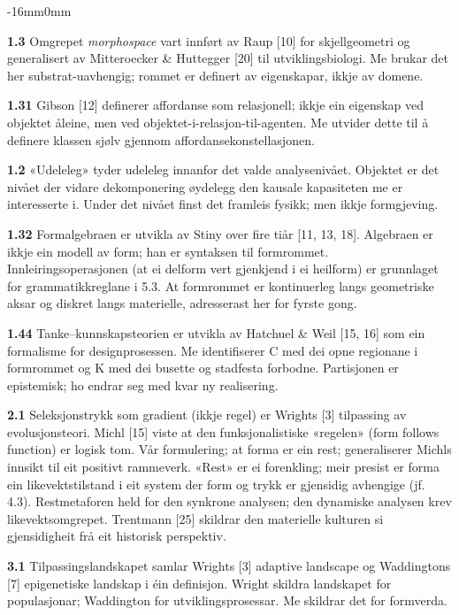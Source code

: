 \documentclass[10pt,oneside]{book}
\newcommand{\silentchapter}[2]{%
  \clearpage
  \markboth{#2}{}%
  \addcontentsline{toc}{chapter}{#1}%
}
\newenvironment{widebody}{%
  \begin{adjustwidth}{-16mm}{0mm}%
}{%
  \end{adjustwidth}%
}
\begin{document}
\silentchapter{Notat}{notat}
\begin{widebody}
{\footnotesize

\textbf{1.3} Omgrepet \textit{morphospace} vart innført av Raup [10] for skjellgeometri og generalisert av Mitteroecker \& Huttegger [20] til utviklingsbiologi. Me brukar det her substrat-uavhengig; rommet er definert av eigenskapar, ikkje av domene.

\textbf{1.31} Gibson [12] definerer affordanse som relasjonell; ikkje ein eigenskap ved objektet åleine, men ved objektet-i-relasjon-til-agenten. Me utvider dette til å definere klassen sjølv gjennom affordansekonstellasjonen.

\textbf{1.2} «Udeleleg» tyder udeleleg innanfor det valde analysenivået. Objektet er det nivået der vidare dekomponering øydelegg den kausale kapasiteten me er interesserte i. Under det nivået finst det framleis fysikk; men ikkje formgjeving.

\textbf{1.32} Formalgebraen er utvikla av Stiny over fire tiår [11, 13, 18]. Algebraen er ikkje ein modell av form; han er syntaksen til formrommet. Innleiringsoperasjonen (at ei delform vert gjenkjend i ei heilform) er grunnlaget for grammatikkreglane i 5.3. At formrommet er kontinuerleg langs geometriske aksar og diskret langs materielle, adresserast her for fyrste gong.

\textbf{1.44} Tanke--kunnskapsteorien er utvikla av Hatchuel \& Weil [15, 16] som ein formalisme for designprosessen. Me identifiserer C med dei opne regionane i formrommet og K med dei busette og stadfesta forbodne. Partisjonen er epistemisk; ho endrar seg med kvar ny realisering.

\textbf{2.1} Seleksjonstrykk som gradient (ikkje regel) er Wrights [3] tilpassing av evolusjonsteori. Michl [15] viste at den funksjonalistiske «regelen» (form follows function) er logisk tom. Vår formulering; at forma er ein rest; generaliserer Michls innsikt til eit positivt rammeverk. «Rest» er ei forenkling; meir presist er forma ein likevektstilstand i eit system der form og trykk er gjensidig avhengige (jf. 4.3). Restmetaforen held for den synkrone analysen; den dynamiske analysen krev likevektsomgrepet. Trentmann [25] skildrar den materielle kulturen si gjensidigheit frå eit historisk perspektiv.

\textbf{3.1} Tilpassingslandskapet samlar Wrights [3] adaptive landscape og Waddingtons [7] epigenetiske landskap i éin definisjon. Wright skildra landskapet for populasjonar; Waddington for utviklingsprosessar. Me skildrar det for formverda.

}
\end{widebody}
\end{document}
